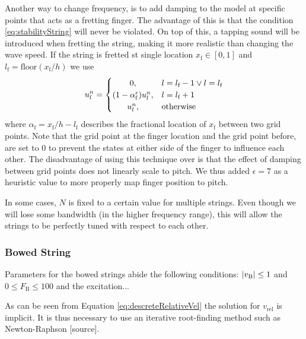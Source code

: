 \documentclass{article}
\begin{document}
Another way to change frequency, is to add damping to the model at specific points that acts as a fretting finger. The advantage of this is that the condition \eqref{eq:stabilityString} will never be violated. On top of this, a tapping sound will be introduced when fretting the string, making it more realistic than changing the wave speed. If the string is fretted st single location $x_\text{f} \in [0, 1]$ and $l_\text{f} = \text{floor}(x_\text{f}/h)$ we use
\begin{equation}
u_l^n = 
    \begin{cases}
        \hfil 0, & l = l_\text{f} - 1 \vee l = l_\text{f}\\
        \hfil (1-\alpha_\text{f}^\epsilon) u_l^n, & l = l_\text{f} + 1\\
        \hfil u_l^n, & \text{otherwise}
    \end{cases}
\end{equation}
where $\alpha_\text{f} = x_\text{f}/h - l_\text{f}$ describes the fractional location of $x_\text{f}$ between two grid points. Note that the grid point at the finger location and the grid point before, are set to 0 to prevent the states at either side of the finger to influence each other. The disadvantage of using this technique over is that the effect of damping between grid points does not linearly scale to pitch. We thus added $\epsilon = 7$ as a heuristic value to more properly map finger position to pitch.

In some cases, $N$ is fixed to a certain value for multiple strings. Even though we will lose some bandwidth (in the higher frequency range), this will allow the strings to be perfectly tuned with respect to each other.

\subsubsection{Bowed String}
Parameters for the bowed strings abide the following conditions: $\abs{v_\text{B}} \leq 1$ and $0 \leq F_\text{B} \leq 100$ and the excitation...

As can be seen from Equation \eqref{eq:descreteRelativeVel} the solution for $v_\text{rel}$ is implicit. It is thus necessary to use an iterative root-finding method such as Newton-Raphson [source].
\end{document}
